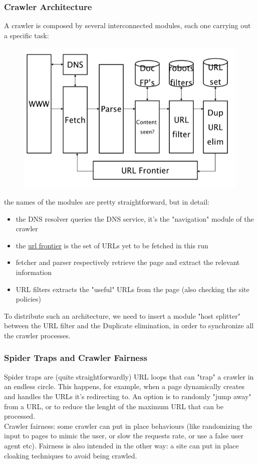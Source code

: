 \documentclass{article}
\begin{document}
			\subsubsection{Crawler Architecture}
				A crawler is composed by several interconnected modules, each one carrying out a specific task:
				\begin{figure}[H]
					\centering
					\includegraphics[width = \textwidth]{images/crawlerArchitecture.png}
				\end{figure}
				the names of the modules are pretty straightforward, but in detail:
				\begin{itemize}
					\item the DNS resolver queries the DNS service, it's the "navigation" module of the crawler
					\item the \underline{url frontier} is the set of URLs yet to be fetched in this run
					\item fetcher and parser respectively retrieve the page and extract the relevant information
					\item URL filters extracts the "useful" URLs from the page (also checking the site policies)
				\end{itemize}
				To distribute such an architecture, we need to insert a module "host splitter" between the URL filter and the Duplicate elimination, in order to synchronize all the crawler processes.

			\subsubsection{Spider Traps and Crawler Fairness}
				Spider traps are (quite straightforwardly) URL loops that can "trap" a crawler in an endless circle. This happens, for example, when a page dynamically creates and handles the URLs it's redirecting to. An option is to randomly "jump away" from a URL, or to reduce the lenght of the maximum URL that can be processed.\\
				Crawler fairness: some crawler can put in place behaviours (like randomizing the input to pages to mimic the user, or slow the requests rate, or use a false user agent etc). Fairness is also intended in the other way: a site can put in place cloaking techniques to avoid being crawled. 
\end{document}

